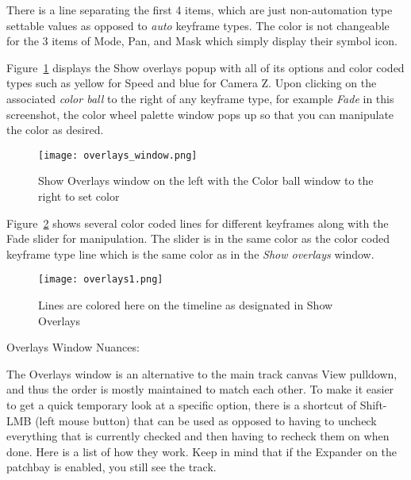 There is a line separating the first 4 items, which are just non-automation type settable values as opposed to \textit{auto} keyframe types.  
The color is not changeable for the 3 items of Mode, Pan, and Mask which simply display their symbol icon.

Figure~\ref{fig:overlays_window} displays the Show overlays popup with all of its options and color coded types such as yellow for Speed and blue for Camera Z.  
Upon clicking on the associated \textit{color ball} to the right of any keyframe type, for example \textit{Fade} in this screenshot, the color wheel palette window pops up so that you can manipulate the color as desired.

\begin{figure}[htpb]
    \centering
    \texttt{[image: overlays\_window.png]}
    \caption{Show Overlays window on the left with the Color ball window to the right to set color}
    \label{fig:overlays_window}
\end{figure}

Figure~\ref{fig:overlays1} shows several color coded lines for different keyframes along with the Fade slider for manipulation.  
The slider is in the same color as the color coded keyframe type line which is the same color as in the \textit{Show overlays} window.

\begin{figure}[htpb]
    \centering
    \texttt{[image: overlays1.png]}
    \caption{Lines are colored here on the timeline as designated in Show Overlays}
    \label{fig:overlays1}
\end{figure}

Overlays Window Nuances:

The Overlays window is an alternative to the main track canvas View pulldown, and thus the order is mostly maintained to match each other.  
To make it easier to get a quick temporary look at a specific option, there is a shortcut of Shift-LMB (left mouse button) that can be used as opposed to having to uncheck everything that is currently checked and then having to recheck them on when done.  
Here is a list of how they work.  Keep in mind that if the Expander on the patchbay is enabled, you still see the track.

